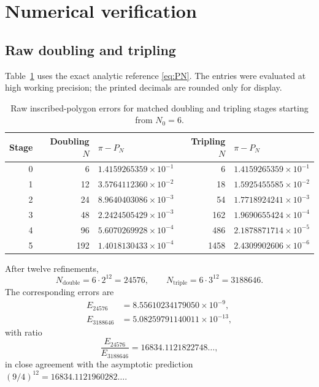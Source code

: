 \documentclass[12pt]{article}
\theoremstyle{definition}
\theoremstyle{remark}
\begin{document}
\section{Numerical verification}

\subsection{Raw doubling and tripling}

Table~\ref{tab:raw-comparison} uses the exact analytic reference
\eqref{eq:PN}.  The entries were evaluated at high working precision; the
printed decimals are rounded only for display.

\begin{table}[htbp]
\centering
\caption{Raw inscribed-polygon errors for matched doubling and tripling stages
starting from $N_0=6$.}
\label{tab:raw-comparison}
\small
\begin{tabular}{@{}r r l r l@{}}
\toprule
Stage & Doubling $N$ & $\pi-P_N$ & Tripling $N$ & $\pi-P_N$ \\
\midrule
0 & 6   & $1.4159265359\times10^{-1}$ & 6    & $1.4159265359\times10^{-1}$ \\
1 & 12  & $3.5764112360\times10^{-2}$ & 18   & $1.5925455585\times10^{-2}$ \\
2 & 24  & $8.9640403086\times10^{-3}$ & 54   & $1.7718924241\times10^{-3}$ \\
3 & 48  & $2.2424505429\times10^{-3}$ & 162  & $1.9690655424\times10^{-4}$ \\
4 & 96  & $5.6070269928\times10^{-4}$ & 486  & $2.1878871714\times10^{-5}$ \\
5 & 192 & $1.4018130433\times10^{-4}$ & 1458 & $2.4309902606\times10^{-6}$ \\
\bottomrule
\end{tabular}
\end{table}

After twelve refinements,
\[
  N_{\mathrm{double}}=6\cdot2^{12}=24576,
  \qquad
  N_{\mathrm{triple}}=6\cdot3^{12}=3188646.
\]
The corresponding errors are
\begin{align*}
  E_{24576}
  &=8.55610234179050\times10^{-9},\\
  E_{3188646}
  &=5.08259791140011\times10^{-13},
\end{align*}
with ratio
\[
  \frac{E_{24576}}{E_{3188646}}
  =16834.1121822748\ldots,
\]
in close agreement with the asymptotic prediction
$(9/4)^{12}=16834.1121960282\ldots$.
\end{document}
